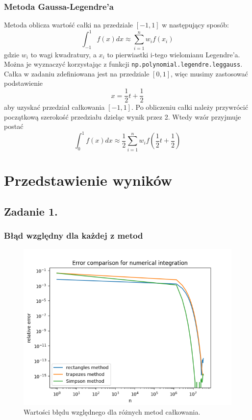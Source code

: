 \documentclass[11pt]{scrartcl}
\begin{document}
    \subsubsection{Metoda Gaussa-Legendre'a}
    Metoda oblicza wartość całki na przedziale $[-1,1]$
    w następujący sposób:
    \[
        \int_{-1}^{1}f(x)dx \approx \sum_{i=1}^{n}w_if(x_i)
    \]
    gdzie $w_i$ to wagi kwadratury, a $x_i$ to pierwiastki
    i-tego wielomianu Legendre'a. Można je wyznaczyć korzystając
    z funkcji \texttt{np.polynomial.legendre.leggauss}. \\
    Całka w zadaniu zdefiniowana jest na przedziale $[0,1]$, więc
    musimy zastosować podstawienie
    \[
        x=\frac{1}{2}t+\frac{1}{2}
    \]
    aby uzyskać przedział całkowania $[-1,1]$. Po obliczeniu całki
    należy przywrócić początkową szerokość przedziału dzieląc wynik
    przez 2. Wtedy wzór przyjmuje postać
    \[
        \int_{0}^{1}f(x)dx \approx \frac{1}{2}\sum_{i=1}^{n}w_i
            f \left( \frac{1}{2}t+\frac{1}{2} \right)
    \]

    \section{Przedstawienie wyników}
    \subsection{Zadanie 1.}
    \subsubsection{Błąd względny dla każdej z metod}
    \begin{figure}[H]
        \centering
        \includegraphics[width=0.8\linewidth]{integration_err.png}
        \caption{Wartości błędu względnego dla różnych metod
        całkowania.}
    \end{figure}
\end{document}
